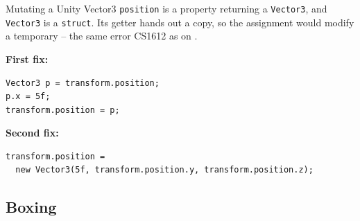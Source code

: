 \begin{solutionframe}{Mutating a Unity Vector3}
  \texttt{position} is a property returning a \texttt{Vector3}, and
  \texttt{Vector3} is a \texttt{struct}. Its getter hands out a copy, so the
  assignment would modify a temporary -- the same error CS1612 as on
  .
  \vspace{1ex}

\textbf{First fix:}\\
  \begin{lstlisting}[basicstyle=\scriptsize\ttfamily]
Vector3 p = transform.position;
p.x = 5f;
transform.position = p;
  \end{lstlisting}

  \textbf{Second fix:}\\
 \begin{lstlisting}[basicstyle=\scriptsize\ttfamily]
transform.position =
  new Vector3(5f, transform.position.y, transform.position.z);
  \end{lstlisting}
  \vspace{3ex}

\end{solutionframe}

\subsection{Boxing}


